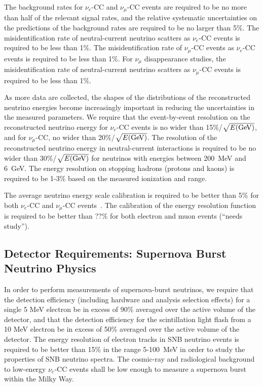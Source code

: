 The background rates for $\nu_e$-CC and $\nu_\mu$-CC events are required
to be no more than half of the relevant signal rates, and the relative
systematic uncertainties on the predictions of the background rates 
are required to be no larger than 5\%.  The misidentification
rate of neutral-current neutrino scatters as $\nu_e$-CC events is
required to be less than 1\%.  The misidentification rate of
$\nu_\mu$-CC events as $\nu_e$-CC events is required to be less than
1\%.  For $\nu_\mu$ disappearance studies, the misidentification rate
of neutral-current neutrino scatters as $\nu_\mu$-CC events is
required to be less than 1\%.

As more data are collected, the shapes of the distributions of the
reconstructed neutrino energies become increasingly important in
reducing the uncertainties in the measured parameters.  We require
that the event-by-event resolution on the reconstructed neutrino
energy for $\nu_e$-CC events is no wider than 15\%/$\sqrt{E({\rm GeV})}$,
 and for $\nu_\mu$-CC, no wider than 20\%/$\sqrt{E({\rm GeV})}$.  
The resolution of the reconstructed neutrino energy in
neutral-current interactions is required to be no wider than
30\%/$\sqrt{E({\rm GeV})}$ for neutrinos with energies between 200~MeV
and 6~GeV.  The energy resolution on stopping hadrons (protons and kaons) is required
to be 1-3\% based on the measured ionization and range.

The average neutrino energy scale calibration is required
to be better than 5\% for both $\nu_e$-CC and $\nu_\mu$-CC
events~\cite{docdb8741}.  %
The calibration of the energy resolution function is required to be better than ??\%
for both electron and muon events (``needs study'').

\subsection{Detector Requirements: Supernova Burst Neutrino Physics}

In order to perform measurements of supernova-burst neutrinos, we
require that the detection efficiency (including hardware and analysis
selection effects) for a single 5 MeV electron be in excess of 90\%
averaged over the active volume of the detector, and that the
detection efficiency for the scintillation light flash from a 10 MeV
electron be in excess of 50\% averaged over the active volume of the
detector.  The energy resolution of electron tracks in SNB neutrino
events is required to be better than 15\% in the range 5-100~MeV in
order to study the properties of SNB neutrino spectra.  The cosmic-ray
and radiological background to low-energy $\nu_e$-CC events shall be low enough to measure
a supernova burst within the Milky Way.

